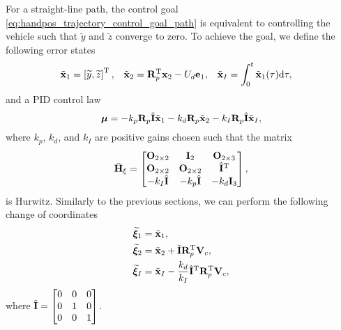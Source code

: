 For a straight-line path, the control goal \eqref{eq:handpos_trajectory_control_goal_path} is equivalent to controlling the vehicle such that $\widetilde{y}$ and $\widetilde{z}$ converge to zero.
To achieve the goal, we define the following error states
    \begin{align}
        \tilde{\mathbf{x}}_1 &= \left[\widetilde{y}, \widetilde{z}\right]^{\mathrm{T}}, &
        \tilde{\mathbf{x}}_2 &= \mathbf{R}_p^{\mathrm{T}} \mathbf{x}_2 - U_d \mathbf{e}_1, &
        \tilde{\mathbf{x}}_I &= \int_{0}^{t} \tilde{\mathbf{x}}_1(\tau) {\rm d}\tau,
    \end{align} 
and a PID control law
\begin{equation}
    \bm{\mu} = -k_p \mathbf{R}_p \hat{\mathbf{I}} \tilde{\mathbf{x}}_1 - k_d \mathbf{R}_p \tilde{\mathbf{x}}_2 - k_I \mathbf{R}_p \hat{\mathbf{I}} \tilde{\mathbf{x}}_I,
    \label{eq:handpos_trajectory_straight_line_path_PID}
\end{equation}
where $k_p$, $k_d$, and $k_I$ are positive gains chosen such that the matrix
\begin{equation}
    \Bar{\mathbf{H}}_{\xi}
    =
    \begin{bmatrix}
        \mathbf{O}_{2 \times 2} & \mathbf{I}_{2} & \mathbf{O}_{2 \times 3} \\
        \mathbf{O}_{2 \times 2} & \mathbf{O}_{2 \times 2} & \hat{\mathbf{I}}^{\mathrm{T}} \\
        -k_I \hat{\mathbf{I}} & -k_p \hat{\mathbf{I}} & -k_d \mathbf{I}_{3}
    \end{bmatrix},
    \label{eq:handpos_trajectory_H_xi_prime}
\end{equation}
is Hurwitz.
Similarly to the previous sections, we can perform the following change of coordinates
\begin{subequations}
    \begin{align}
        \widetilde{\bm{\xi}}_1 &= \tilde{\mathbf{x}}_1, \\
        \widetilde{\bm{\xi}}_2 &= \tilde{\mathbf{x}}_2 + \tilde{\mathbf{I}} \mathbf{R}_p^{\mathrm{T}} \mathbf{V}_c, \\
        \widetilde{\bm{\xi}}_I &= \tilde{\mathbf{x}}_I - \frac{k_d}{k_I}\hat{\mathbf{I}}^{\mathrm{T}} \mathbf{R}_p^{\mathrm{T}} \mathbf{V}_c,
    \end{align} \label{eq:handpos_trajectory_error_coordinates_straight_line_path}
\end{subequations}
where $\tilde{\mathbf{I}} = \begin{bmatrix} 0 & 0 & 0 \\ 0 & 1 & 0 \\ 0 & 0 & 1 \end{bmatrix}$.
